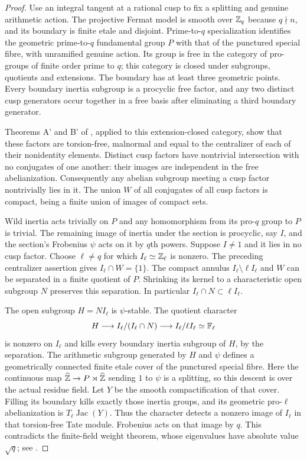 \begin{proof}
Use an integral tangent at a rational cusp to fix a splitting and genuine arithmetic action. The projective Fermat model is smooth over $\mathbb Z_q$ because $q\nmid n$, and its boundary is finite etale and disjoint. Prime-to-$q$ specialization identifies the geometric prime-to-$q$ fundamental group $P$ with that of the punctured special fibre, with unramified genuine action. Its group is free in the category of pro-groups of finite order prime to $q$; this category is closed under subgroups, quotients and extensions. The boundary has at least three geometric points. Every boundary inertia subgroup is a procyclic free factor, and any two distinct cusp generators occur together in a free basis after eliminating a third boundary generator.

Theorems A' and B' of \citet{cHerfortRibes1985}, applied to this extension-closed category, show that these factors are torsion-free, malnormal and equal to the centralizer of each of their nonidentity elements. Distinct cusp factors have nontrivial intersection with no conjugates of one another: their images are independent in the free abelianization. Consequently any abelian subgroup meeting a cusp factor nontrivially lies in it. The union $W$ of all conjugates of all cusp factors is compact, being a finite union of images of compact sets.

Wild inertia acts trivially on $P$ and any homomorphism from its pro-$q$ group to $P$ is trivial. The remaining image of inertia under the section is procyclic, say $I$, and the section's Frobenius $\psi$ acts on it by $q$th powers. Suppose $I\ne1$ and it lies in no cusp factor. Choose $\ell\ne q$ for which $I_\ell\simeq\mathbb Z_\ell$ is nonzero. The preceding centralizer assertion gives $I_\ell\cap W=\{1\}$. The compact annulus $I_\ell\setminus\ell I_\ell$ and $W$ can be separated in a finite quotient of $P$. Shrinking its kernel to a characteristic open subgroup $N$ preserves this separation. In particular $I_\ell\cap N\subset\ell I_\ell$.

The open subgroup $H=NI_\ell$ is $\psi$-stable. The quotient character
\[
H\longrightarrow I_\ell/(I_\ell\cap N)
\longrightarrow I_\ell/\ell I_\ell\simeq\mathbb F_\ell
\]
is nonzero on $I_\ell$ and kills every boundary inertia subgroup of $H$, by the separation. The arithmetic subgroup generated by $H$ and $\psi$ defines a geometrically connected finite etale cover of the punctured special fibre. Here the continuous map $\widehat{\mathbb Z}\to P\rtimes\widehat{\mathbb Z}$ sending $1$ to $\psi$ is a splitting, so this descent is over the actual residue field. Let $Y$ be the smooth compactification of that cover. Filling its boundary kills exactly those inertia groups, and its geometric pro-$\ell$ abelianization is $T_\ell\operatorname{Jac}(Y)$. Thus the character detects a nonzero image of $I_\ell$ in that torsion-free Tate module. Frobenius acts on that image by $q$. This contradicts the finite-field weight theorem, whose eigenvalues have absolute value $\sqrt q$; see \citet[II, Theorem 1.1(b); III, Proposition 9.1]{Milne2008}.


\end{proof}

